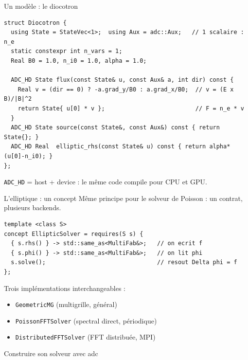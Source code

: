\documentclass[11pt,aspectratio=169]{beamer}
\begin{document}
\begin{frame}[fragile]{Un modèle : le diocotron}
\begin{lstlisting}
struct Diocotron {
  using State = StateVec<1>;  using Aux = adc::Aux;   // 1 scalaire : n_e
  static constexpr int n_vars = 1;
  Real B0 = 1.0, n_i0 = 1.0, alpha = 1.0;

  ADC_HD State flux(const State& u, const Aux& a, int dir) const {
    Real v = (dir == 0) ? -a.grad_y/B0 : a.grad_x/B0;  // v = (E x B)/|B|^2
    return State{ u[0] * v };                          // F = n_e * v
  }
  ADC_HD State source(const State&, const Aux&) const { return State{}; }
  ADC_HD Real  elliptic_rhs(const State& u) const { return alpha*(u[0]-n_i0); }
};
\end{lstlisting}

\vspace{0.3em}
\small \texttt{ADC\_HD} = host + device : le même code compile pour CPU et GPU.
\end{frame}

\begin{frame}[fragile]{L'elliptique : un concept}
Même principe pour le solveur de Poisson : un contrat, plusieurs backends.

\begin{lstlisting}
template <class S>
concept EllipticSolver = requires(S s) {
  { s.rhs() } -> std::same_as<MultiFab&>;   // on ecrit f
  { s.phi() } -> std::same_as<MultiFab&>;   // on lit phi
  s.solve();                                // resout Delta phi = f
};
\end{lstlisting}

\vspace{0.5em}
Trois implémentations interchangeables :
\begin{itemize}\setlength\itemsep{0.15em}
  \item \texttt{GeometricMG} (multigrille, général)
  \item \texttt{PoissonFFTSolver} (spectral direct, périodique)
  \item \texttt{DistributedFFTSolver} (FFT distribuée, MPI)
\end{itemize}
\end{frame}

\begin{frame}[standout]
  Construire son solveur avec adc
\end{frame}
\end{document}
